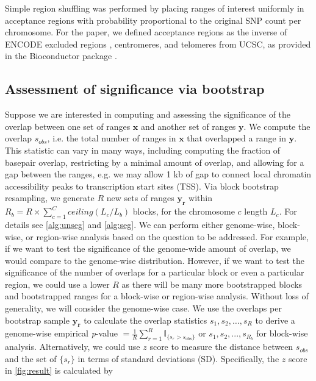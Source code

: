 \documentclass{article}
\begin{document}
Simple region shuffling was performed by placing ranges of interest
uniformly in acceptance regions with probability proportional to the
original SNP count per chromosome. For the paper, we defined
acceptance regions as the inverse of
ENCODE excluded regions \citep{amemiya2019encode},
centromeres, and telomeres from UCSC,
as provided in the  Bioconductor package
\citep{excluderanges}.

\subsection{Assessment of significance via bootstrap}

Suppose we are interested in computing and assessing the significance
of the overlap between one set of ranges
$\bm{x}$ and another set of ranges $\bm{y}$.
We compute the overlap $s_{obs}$, i.e. the total number of 
ranges in $\bm{x}$ that overlapped a range in $\bm{y}$.
This statistic can vary in many ways, including computing the fraction of
basepair overlap, restricting by a minimal amount of overlap, and
allowing for a gap between the ranges, e.g. we may allow 1 kb of gap
to connect local chromatin accessibility peaks to transcription start
sites (TSS).
Via block bootstrap resampling, we generate $R$ new
sets of ranges $\bm{y_r}$ within $R_b = R \times \sum_{c=1}^{C} ceiling(L_c / L_b)$ blocks, for the chromosome $c$ length $L_c$.
For details see \cref{alg:unseg} and \cref{alg:seg}.
We can perform either genome-wise, block-wise, or region-wise analysis
based on the question to be addressed. For example, if we want to test
the significance of the genome-wide amount of overlap, we would compare
to the genome-wise distribution. However, if we want to
test the significance of the number of overlaps for a particular
block or even a particular region, we could use a lower $R$ as there
will be many more bootstrapped blocks and bootstrapped ranges for a
block-wise or region-wise analysis.
Without loss of generality, we will consider the genome-wise case.
We use the overlaps per bootstrap sample $\bm{y_r}$ to calculate the
overlap statistics $s_{1}, s_{2}, \dots, s_{R}$
to derive a genome-wise empirical \textit{p}-value
$= \frac{1}{R} \sum_{r=1}^R \mathbb{I}_{\{s_r > s_\text{obs}\}}$ or
$s_{1}, s_{2},..., s_{R_b}$ for block-wise analysis.
Alternatively, we could use $z$ score to measure the
distance between $s_{obs}$ and the
set of $\{s_r\}$ in terms of standard deviations (SD).
Specifically, the
$z$ score in \cref{fig:result} is calculated by
\end{document}
